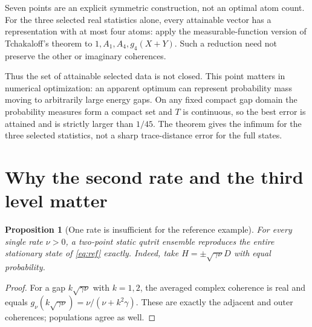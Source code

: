 \documentclass[11pt,a4paper]{article}
\newtheorem{proposition}[theorem]{Proposition}
\begin{document}
Seven points are an explicit symmetric construction, not an optimal
atom count. For the three selected real statistics alone, every
attainable vector has a representation with at most four atoms:
apply the measurable-function version of Tchakaloff's theorem
\cite[Corollary 2]{bayer} to $1,A_1,A_4,g_4(X+Y)$.
Such a reduction need not preserve the other or imaginary coherences.

Thus the set of attainable selected data is not closed. This point
matters in numerical optimization: an apparent optimum can represent
probability mass moving to arbitrarily large energy gaps. On any fixed
compact gap domain the probability measures form a compact set and
$T$ is continuous, so the best error is attained and is strictly larger
than $1/45$. The theorem gives the infimum for the three selected
statistics, not a sharp trace-distance error for the full states.

\section{Why the second rate and the third level matter}
\begin{proposition}[One rate is insufficient for the reference example]
For every single rate $\nu>0$, a two-point static qutrit ensemble
reproduces the entire stationary state of \eqref{eq:ref} exactly.
Indeed, take $H=\pm\sqrt{\gamma\nu}D$ with equal probability.
\end{proposition}
\begin{proof}
For a gap $k\sqrt{\gamma\nu}$ with $k=1,2$, the averaged complex
coherence is real and equals
$g_\nu(k\sqrt{\gamma\nu})=\nu/(\nu+k^2\gamma)$.
These are exactly the adjacent and outer coherences; populations
agree as well.
\end{proof}
\end{document}
